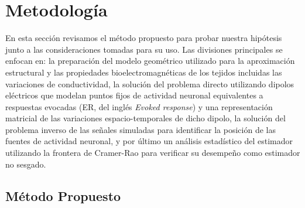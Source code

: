 %
\chapter{Metodología}

\label{sec:methodology}


En esta sección revisamos el método propuesto para probar nuestra hipótesis junto a las consideraciones tomadas para su uso. 
Las divisiones principales se enfocan en: la preparación del modelo geométrico utilizado para la aproximación estructural y las propiedades bioelectromagnéticas de los tejidos incluidas las variaciones de conductividad, la solución del problema directo utilizando dipolos eléctricos que modelan puntos fijos de actividad neuronal equivalentes a respuestas evocadas (ER, del inglés \emph{Evoked response}) y una representación matricial de las variaciones espacio-temporales de dicho dipolo, la solución del problema inverso de las señales simuladas para identificar la posición de las fuentes de actividad neuronal, y por último un análisis estadístico del estimador utilizando la frontera de Cramer-Rao para verificar su desempeño como estimador no sesgado.

\section{Método Propuesto}
\label{sec:methodology:method}

